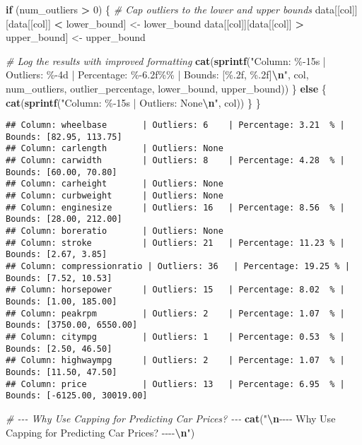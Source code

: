 \documentclass[
]{article}
\newenvironment{Shaded}{\begin{snugshade}}{\end{snugshade}}
\newcommand{\CommentTok}[1]{\textcolor[rgb]{0.56,0.35,0.01}{\textit{#1}}}
\newcommand{\ControlFlowTok}[1]{\textcolor[rgb]{0.13,0.29,0.53}{\textbf{#1}}}
\newcommand{\DecValTok}[1]{\textcolor[rgb]{0.00,0.00,0.81}{#1}}
\newcommand{\FunctionTok}[1]{\textcolor[rgb]{0.13,0.29,0.53}{\textbf{#1}}}
\newcommand{\NormalTok}[1]{#1}
\newcommand{\OtherTok}[1]{\textcolor[rgb]{0.56,0.35,0.01}{#1}}
\newcommand{\SpecialCharTok}[1]{\textcolor[rgb]{0.81,0.36,0.00}{\textbf{#1}}}
\newcommand{\StringTok}[1]{\textcolor[rgb]{0.31,0.60,0.02}{#1}}
\begin{document}
\begin{Shaded}
\begin{Highlighting}[]
  \ControlFlowTok{if}\NormalTok{ (num\_outliers }\SpecialCharTok{\textgreater{}} \DecValTok{0}\NormalTok{) \{}
    \CommentTok{\# Cap outliers to the lower and upper bounds}
\NormalTok{    data[[col]][data[[col]] }\SpecialCharTok{\textless{}}\NormalTok{ lower\_bound] }\OtherTok{\textless{}{-}}\NormalTok{ lower\_bound}
\NormalTok{    data[[col]][data[[col]] }\SpecialCharTok{\textgreater{}}\NormalTok{ upper\_bound] }\OtherTok{\textless{}{-}}\NormalTok{ upper\_bound}
    
    \CommentTok{\# Log the results with improved formatting}
    \FunctionTok{cat}\NormalTok{(}\FunctionTok{sprintf}\NormalTok{(}\StringTok{"Column: \%{-}15s | Outliers: \%{-}4d | Percentage: \%{-}6.2f\%\% | Bounds: [\%.2f, \%.2f]}\SpecialCharTok{\textbackslash{}n}\StringTok{"}\NormalTok{,}
\NormalTok{                col, num\_outliers, outlier\_percentage, lower\_bound, upper\_bound))}
\NormalTok{  \} }\ControlFlowTok{else}\NormalTok{ \{}
    \FunctionTok{cat}\NormalTok{(}\FunctionTok{sprintf}\NormalTok{(}\StringTok{"Column: \%{-}15s | Outliers: None}\SpecialCharTok{\textbackslash{}n}\StringTok{"}\NormalTok{, col))}
\NormalTok{  \}}
\NormalTok{\}}
\end{Highlighting}
\end{Shaded}

\begin{verbatim}
## Column: wheelbase       | Outliers: 6    | Percentage: 3.21  % | Bounds: [82.95, 113.75]
## Column: carlength       | Outliers: None
## Column: carwidth        | Outliers: 8    | Percentage: 4.28  % | Bounds: [60.00, 70.80]
## Column: carheight       | Outliers: None
## Column: curbweight      | Outliers: None
## Column: enginesize      | Outliers: 16   | Percentage: 8.56  % | Bounds: [28.00, 212.00]
## Column: boreratio       | Outliers: None
## Column: stroke          | Outliers: 21   | Percentage: 11.23 % | Bounds: [2.67, 3.85]
## Column: compressionratio | Outliers: 36   | Percentage: 19.25 % | Bounds: [7.52, 10.53]
## Column: horsepower      | Outliers: 15   | Percentage: 8.02  % | Bounds: [1.00, 185.00]
## Column: peakrpm         | Outliers: 2    | Percentage: 1.07  % | Bounds: [3750.00, 6550.00]
## Column: citympg         | Outliers: 1    | Percentage: 0.53  % | Bounds: [2.50, 46.50]
## Column: highwaympg      | Outliers: 2    | Percentage: 1.07  % | Bounds: [11.50, 47.50]
## Column: price           | Outliers: 13   | Percentage: 6.95  % | Bounds: [-6125.00, 30019.00]
\end{verbatim}

\begin{Shaded}
\begin{Highlighting}[]
\CommentTok{\# {-}{-}{-} Why Use Capping for Predicting Car Prices? {-}{-}{-}}
\FunctionTok{cat}\NormalTok{(}\StringTok{"}\SpecialCharTok{\textbackslash{}n}\StringTok{{-}{-}{-}{-} Why Use Capping for Predicting Car Prices? {-}{-}{-}{-}}\SpecialCharTok{\textbackslash{}n}\StringTok{"}\NormalTok{)}
\end{Highlighting}
\end{Shaded}
\end{document}
